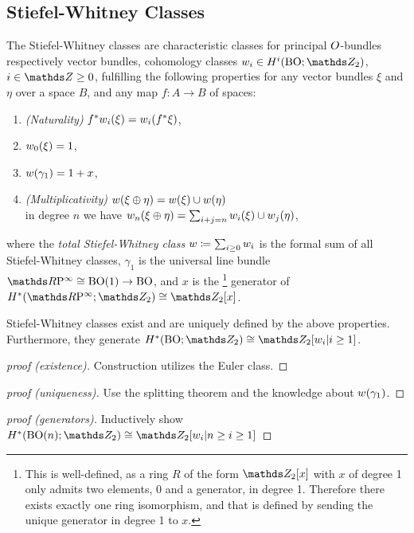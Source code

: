\subsection{Stiefel-Whitney Classes}
\begin{Def}\label{def:swclasses}
  The Stiefel-Whitney classes are
  characteristic classes for principal $O$-bundles
  respectively vector bundles,
  \idest cohomology classes
  $w_i\in H^i(\BO;\Zmod2)$, $i\in\Z\geq0$,
  fulfilling the following properties for any vector bundles $\xi$ and
  $\eta$ over a space $B$, and any map $f\colon A\to B$ of spaces:
  \begin{enumerate}
  \item \emph{(Naturality)} ${f}^*w_i(\xi) = w_i({f}^* \xi)$,
  \item $w_0(\xi)=1$,
  \item $w(\gamma_1) = 1 + x$,
  \item \emph{(Multiplicativity)} $w(\xi \oplus \eta) = w(\xi)\cup w(\eta)$
    \\\idest in degree $n$ we have
    $w_n(\xi\oplus\eta) = \sum_{i+j=n}w_i(\xi) \cup w_j(\eta)$,
  \end{enumerate}
  where the \emph{total Stiefel-Whitney class}
  $w\coloneqq\sum_{i\geq 0}w_i$ is the formal sum of all
  Stiefel-Whitney classes,
  $\gamma_1$ is the universal line bundle $\RP\cong\BO(1)\to\BO$,
  and $x$ is the%
  \footnote{
    This is well-defined, as a ring $R$ of the form $\Zmod2[x]$
    with $x$ of degree 1 only admits two elements, $0$ and a
    generator, in degree 1. Therefore there exists exactly one ring
    isomorphism, and that is defined by sending the unique generator in
    degree 1 to $x$.
  }
  generator of $H^*(\RP;\Zmod2)\cong\Zmod2[x]$.
\end{Def}

\begin{Thm} %
  Stiefel-Whitney classes exist and are uniquely defined by the above
  properties. Furthermore, they generate $H^*(\BO;\Zmod2)\cong \Zmod2[\w_i|i\geq1]$.
  \begin{proof}[proof (existence)]
    Construction utilizes the Euler class.
  \end{proof}
  \begin{proof}[proof (uniqueness)]
    Use the splitting theorem and the knowledge about $w(\gamma_1)$.
  \end{proof}
  \begin{proof}[proof (generators)]
    Inductively show $H^*(\BO(n);\Zmod2)\cong \Zmod2[\w_i|n\geq i\geq1]$
  \end{proof}
\end{Thm}

